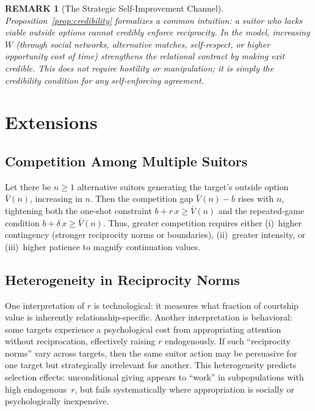 \documentclass[AER]{AEA}
\newtheorem{remark}{REMARK}
\begin{document}
\begin{remark}[The Strategic Self-Improvement Channel]
Proposition~\ref{prop:credibility} formalizes a common intuition: a suitor who lacks viable outside options cannot credibly enforce reciprocity.
In the model, increasing $W$ (through social networks, alternative matches, self-respect, or higher opportunity cost of time) strengthens the relational contract by making exit credible.
This does not require hostility or manipulation; it is simply the credibility condition for any self-enforcing agreement.
\end{remark}

\section{Extensions}\label{sec:extensions}

\subsection{Competition Among Multiple Suitors}

Let there be $n\ge 1$ alternative suitors generating the target's outside option $\bar{V}(n)$, increasing in $n$.
Then the competition gap $\bar{V}(n)-b$ rises with $n$, tightening both the one-shot constraint $b+r\,x\ge \bar{V}(n)$ and the repeated-game condition $b+\delta\, x\ge \bar{V}(n)$.
Thus, greater competition requires either (i)~higher contingency (stronger reciprocity norms or boundaries), (ii)~greater intensity, or (iii)~higher patience to magnify continuation values.

\subsection{Heterogeneity in Reciprocity Norms}

One interpretation of $r$ is technological: it measures what fraction of courtship value is inherently relationship-specific.
Another interpretation is behavioral: some targets experience a psychological cost from appropriating attention without reciprocation, effectively raising $r$ endogenously.
If such ``reciprocity norms'' vary across targets, then the same suitor action may be persuasive for one target but strategically irrelevant for another.
This heterogeneity predicts selection effects: unconditional giving appears to ``work'' in subpopulations with high endogenous~$r$, but fails systematically where appropriation is socially or psychologically inexpensive.
\end{document}
